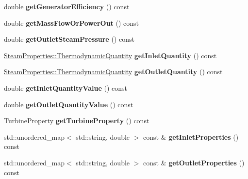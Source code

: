 \begin{DoxyCompactItemize}
\item 
\mbox{\label{class_turbine_a92266fd994310d1842ba37c05bc40bf8}} 
double {\bfseries get\+Generator\+Efficiency} () const
\item 
\mbox{\label{class_turbine_a820a090d264b96ee84f717555545c287}} 
double {\bfseries get\+Mass\+Flow\+Or\+Power\+Out} () const
\item 
\mbox{\label{class_turbine_a1589b2364a553db7aaa875bb543d171d}} 
double {\bfseries get\+Outlet\+Steam\+Pressure} () const
\item 
\mbox{\label{class_turbine_ac9e91d9539cea5cd1e0037c397c28c78}} 
\hyperlink{class_steam_properties_ae0294bedf7d178c2d8fb6aed0f62fbff}{Steam\+Properties\+::\+Thermodynamic\+Quantity} {\bfseries get\+Inlet\+Quantity} () const
\item 
\mbox{\label{class_turbine_acd3e98ab67754b652de97498d9bec6d2}} 
\hyperlink{class_steam_properties_ae0294bedf7d178c2d8fb6aed0f62fbff}{Steam\+Properties\+::\+Thermodynamic\+Quantity} {\bfseries get\+Outlet\+Quantity} () const
\item 
\mbox{\label{class_turbine_a3d8a3f317fa71abb3404144371615725}} 
double {\bfseries get\+Inlet\+Quantity\+Value} () const
\item 
\mbox{\label{class_turbine_aca98f128213e02e95dfd6f4b2ad8de4e}} 
double {\bfseries get\+Outlet\+Quantity\+Value} () const
\item 
\mbox{\label{class_turbine_a14f6eff49b501aa8c5a22d404dbeaac0}} 
Turbine\+Property {\bfseries get\+Turbine\+Property} () const
\item 
\mbox{\label{class_turbine_a575f5527de69f57d4f344f3c66ee898d}} 
std\+::unordered\+\_\+map$<$ std\+::string, double $>$ const  \& {\bfseries get\+Inlet\+Properties} () const
\item 
\mbox{\label{class_turbine_ae6ac54bac33feff9d06800acdefacf9d}} 
std\+::unordered\+\_\+map$<$ std\+::string, double $>$ const  \& {\bfseries get\+Outlet\+Properties} () const

\end{DoxyCompactItemize}
